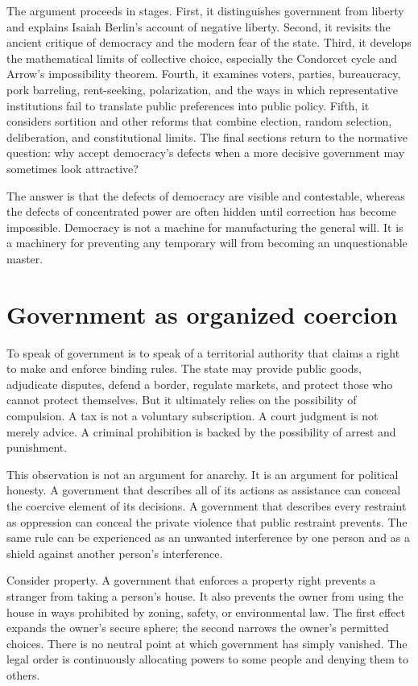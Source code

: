 ﻿\documentclass[12pt,a4paper]{book}
\begin{document}
The argument proceeds in stages.  First, it distinguishes government from
liberty and explains Isaiah Berlin's account of negative liberty.  Second,
it revisits the ancient critique of democracy and the modern fear of the
state.  Third, it develops the mathematical limits of collective choice,
especially the Condorcet cycle and Arrow's impossibility theorem.  Fourth,
it examines voters, parties, bureaucracy, pork barreling, rent-seeking,
polarization, and the ways in which representative institutions fail to
translate public preferences into public policy.  Fifth, it considers
sortition and other reforms that combine election, random selection,
deliberation, and constitutional limits.  The final sections return to the
normative question: why accept democracy's defects when a more decisive
government may sometimes look attractive?

The answer is that the defects of democracy are visible and contestable,
whereas the defects of concentrated power are often hidden until correction
has become impossible.  Democracy is not a machine for manufacturing the
general will.  It is a machinery for preventing any temporary will from
becoming an unquestionable master.

\section{Government as organized coercion}

To speak of government is to speak of a territorial authority that claims a
right to make and enforce binding rules.  The state may provide public goods,
adjudicate disputes, defend a border, regulate markets, and protect those
who cannot protect themselves.  But it ultimately relies on the possibility
of compulsion.  A tax is not a voluntary subscription.  A court judgment is
not merely advice.  A criminal prohibition is backed by the possibility of
arrest and punishment.

This observation is not an argument for anarchy.  It is an argument for
political honesty.  A government that describes all of its actions as
assistance can conceal the coercive element of its decisions.  A government
that describes every restraint as oppression can conceal the private
violence that public restraint prevents.  The same rule can be experienced
as an unwanted interference by one person and as a shield against another
person's interference.

Consider property.  A government that enforces a property right prevents a
stranger from taking a person's house.  It also prevents the owner from
using the house in ways prohibited by zoning, safety, or environmental law.
The first effect expands the owner's secure sphere; the second narrows the
owner's permitted choices.  There is no neutral point at which government
has simply vanished.  The legal order is continuously allocating powers to
some people and denying them to others.
\end{document}
